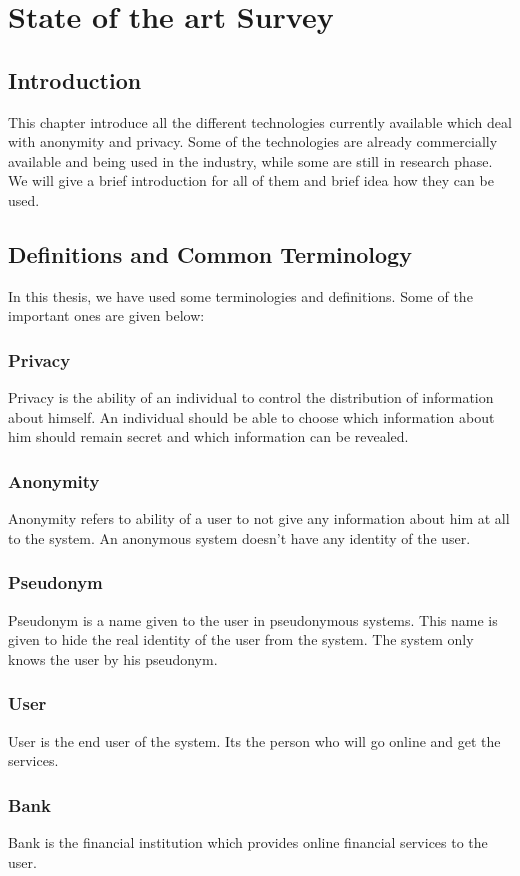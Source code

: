\chapter{State of the art Survey}

\section{Introduction}
This chapter introduce all the different technologies currently available which deal with anonymity and privacy. Some of the technologies are already commercially available and being used in the industry, while some are still in research phase. We will give a brief introduction for all of them and brief idea how they can be used.


\section{Definitions and Common Terminology}
In this thesis, we have used some terminologies and definitions. Some of the important ones are given below:
\subsection{Privacy}
Privacy is the ability of an individual to control the distribution of information about himself. An individual should be able to choose which information about him should remain secret and which information can be revealed.
\subsection{Anonymity}
Anonymity refers to ability of a user to not give any information about him at all to the system. An anonymous system doesn't have any identity of the user.
\subsection{Pseudonym}
Pseudonym is a name given to the user in pseudonymous systems. This name is given to hide the real identity of the user from the system. The system only knows the user by his pseudonym.
\subsection{User}
User is the end user of the system. Its the person who will go online and get the services.
\subsection{Bank}
Bank is the financial institution which provides online financial services to the user. 
